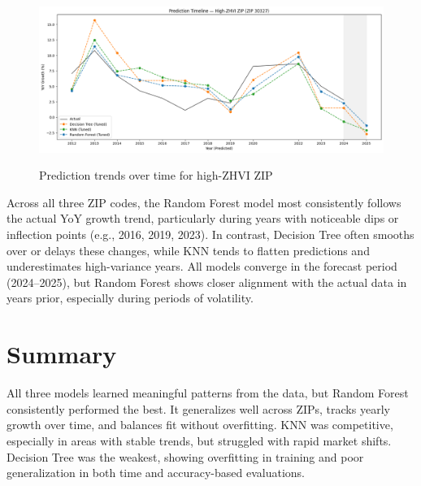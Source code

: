\begin{figure}[!ht]
    \centering
    \includegraphics[width=\textwidth]{figures/timelineHigh.png}
    \caption{Prediction trends over time for high-ZHVI ZIP}
    \caption*{\hspace{1em}}
    \label{fig:timeline_high}
\end{figure}
\FloatBarrier

Across all three ZIP codes, the Random Forest model most consistently follows the actual YoY growth trend, particularly during years with noticeable dips or inflection points (e.g., 2016, 2019, 2023). In contrast, Decision Tree often smooths over or delays these changes, while KNN tends to flatten predictions and underestimates high-variance years. All models converge in the forecast period (2024–2025), but Random Forest shows closer alignment with the actual data in years prior, especially during periods of volatility.

\section{Summary}

All three models learned meaningful patterns from the data, but Random Forest consistently performed the best. It generalizes well across ZIPs, tracks yearly growth over time, and balances fit without overfitting. KNN was competitive, especially in areas with stable trends, but struggled with rapid market shifts. Decision Tree was the weakest, showing overfitting in training and poor generalization in both time and accuracy-based evaluations.
